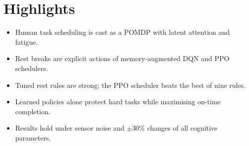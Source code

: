 \documentclass[11pt]{article}
\begin{document}
\section*{Highlights}
\begin{itemize}
\item Human task scheduling is cast as a POMDP with latent attention and fatigue.
\item Rest breaks are explicit actions of memory-augmented DQN and PPO schedulers.
\item Tuned rest rules are strong; the PPO scheduler beats the best of nine rules.
\item Learned policies alone protect hard tasks while maximising on-time completion.
\item Results hold under sensor noise and $\pm$30\% changes of all cognitive parameters.
\end{itemize}
\end{document}
